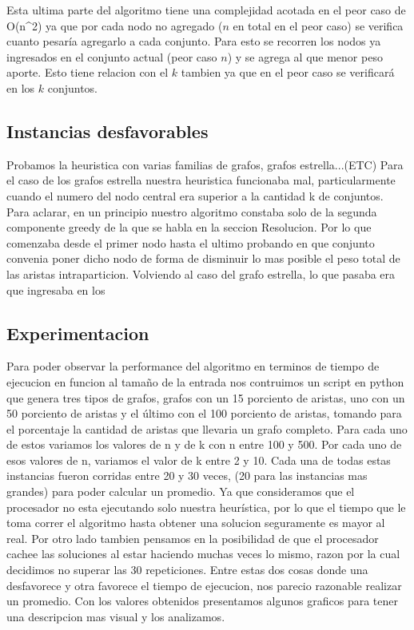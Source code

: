 Esta ultima parte del algoritmo tiene una complejidad acotada en el peor caso de O(n^2) ya que por cada nodo no agregado ($n$ en total en el peor caso) se verifica cuanto pesaría agregarlo a cada conjunto. Para esto se recorren los nodos ya ingresados en el conjunto actual (peor caso $n$) y se agrega al que menor peso aporte. Esto tiene relacion con el $k$ tambien ya que en el peor caso se verificará en los $k$ conjuntos.

\subsection{Instancias desfavorables}


Probamos la heuristica con varias familias de grafos, grafos estrella...(ETC) 
Para el caso de los grafos estrella nuestra heuristica funcionaba mal, particularmente cuando el numero del nodo central era superior a la cantidad k de conjuntos. 
Para aclarar, en un principio nuestro algoritmo constaba solo de la segunda componente greedy de la que se habla en la seccion Resolucion. Por lo que comenzaba desde el primer nodo hasta el ultimo probando en que conjunto convenia poner dicho nodo de forma de disminuir lo mas posible el peso total de las aristas intraparticion. Volviendo al caso del grafo estrella, lo que pasaba era que ingresaba en los

\subsection{Experimentacion}

Para poder observar la performance del algoritmo en terminos de tiempo de ejecucion en funcion al tamaño de la entrada nos contruimos un script en python que genera tres tipos de grafos, grafos con un 15 porciento de aristas, uno con un 50 porciento de aristas y el último con el 100 porciento de aristas, tomando para el porcentaje la cantidad de aristas que llevaria un grafo completo.
Para cada uno de estos variamos los valores de n y de k con n entre 100 y 500. 
Por cada uno de esos valores de n, variamos el valor de k entre 2 y 10.
Cada una de todas estas instancias fueron corridas entre 20 y 30 veces, (20 para las instancias mas grandes) para poder calcular un promedio. Ya que consideramos que el procesador no esta ejecutando solo nuestra heurística, por lo que el tiempo que le toma correr el algoritmo hasta obtener una solucion seguramente es mayor al real. Por otro lado tambien pensamos en la posibilidad de que el procesador cachee las soluciones al estar haciendo muchas veces lo mismo, razon por la cual decidimos no superar las 30 repeticiones. Entre estas dos cosas donde una desfavorece y otra favorece el tiempo de ejecucion, nos parecio razonable realizar un promedio.
Con los valores obtenidos presentamos algunos graficos para tener una descripcion mas visual y los analizamos.

